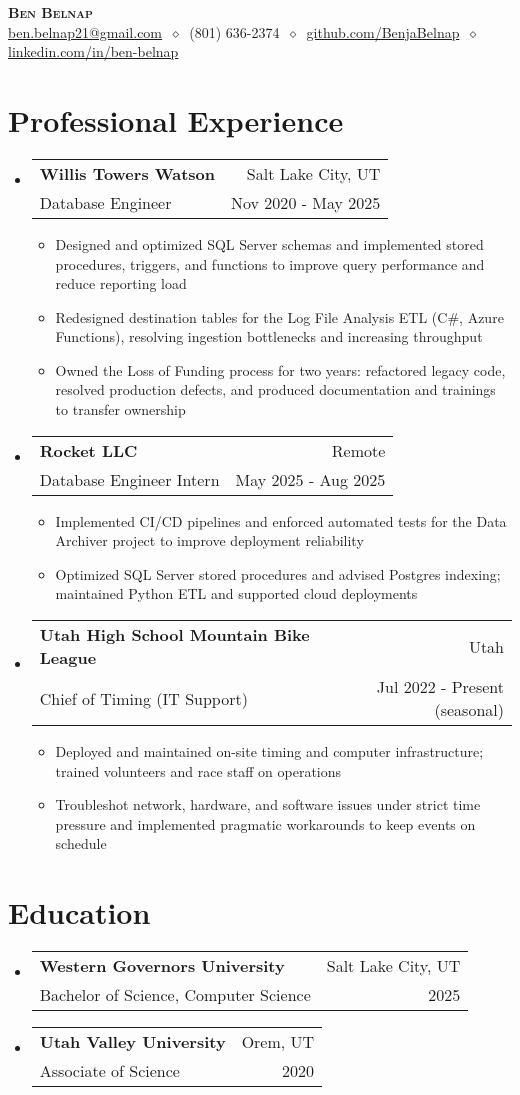 \documentclass[letterpaper,11pt]{article}
\makeatletter
\newcommand{\cvitem}[1]{
  \item\small{
    {#1\vspace{-2pt}}
  }
}
\newcommand{\cvheading}[4]{
  \vspace{-2pt}\item
    \begin{tabular*}{\textwidth}[t]{l@{\extracolsep{\fill}}r}
      \textbf{#1} & #2 \\
      \small#3 & \small #4 \\
    \end{tabular*}\vspace{-7pt}
}
\newcommand{\cvheadingstart}{\begin{itemize}[leftmargin=0in, label={}]}
\newcommand{\cvheadingend}{\end{itemize}}
\newcommand{\cvitemstart}{\begin{itemize}[label=\textopenbullet]\justifying}
\newcommand{\cvitemend}{\end{itemize}\vspace{-5pt}}
\makeatother
\begin{document}
\begin{center}
  \textbf{\LARGE\scshape Ben Belnap} \\
  \vspace{1pt}\small
  \href{mailto:ben.belnap21@gmail.com}{ben.belnap21@gmail.com}
  $\ \diamond\ $ 
  (801) 636-2374
  $\ \diamond\ $
  \href{https://github.com/BenjaBelnap}{github.com/BenjaBelnap}
  $\ \diamond\ $
  \href{https://www.linkedin.com/in/ben-belnap}{linkedin.com/in/ben-belnap}
\end{center}

\section{Professional Experience}
\cvheadingstart
  \cvheading
    {Willis Towers Watson}{Salt Lake City, UT}
    {Database Engineer}{Nov 2020 - May 2025}
  \cvitemstart
  \cvitem{Designed and optimized SQL Server schemas and implemented stored procedures, triggers, and functions to improve query performance and reduce reporting load}
  \cvitem{Redesigned destination tables for the Log File Analysis ETL (C\#, Azure Functions), resolving ingestion bottlenecks and increasing throughput}
  \cvitem{Owned the Loss of Funding process for two years: refactored legacy code, resolved production defects, and produced documentation and trainings to transfer ownership}
  \cvitemend

  \cvheading
    {Rocket LLC}{Remote}
    {Database Engineer Intern}{May 2025 - Aug 2025}
  \cvitemstart
  \cvitem{Implemented CI/CD pipelines and enforced automated tests for the Data Archiver project to improve deployment reliability}
  \cvitem{Optimized SQL Server stored procedures and advised Postgres indexing; maintained Python ETL and supported cloud deployments}
  \cvitemend

  \cvheading
    {Utah High School Mountain Bike League}{Utah}
    {Chief of Timing (IT Support)}{Jul 2022 - Present (seasonal)}
  \cvitemstart
  \cvitem{Deployed and maintained on-site timing and computer infrastructure; trained volunteers and race staff on operations}
  \cvitem{Troubleshot network, hardware, and software issues under strict time pressure and implemented pragmatic workarounds to keep events on schedule}
  \cvitemend
\cvheadingend

\section{Education}
\cvheadingstart
  \cvheading
    {Western Governors University}{Salt Lake City, UT}
    {Bachelor of Science, Computer Science}{2025}
  \cvheading
    {Utah Valley University}{Orem, UT}
    {Associate of Science}{2020}
\cvheadingend
\end{document}
